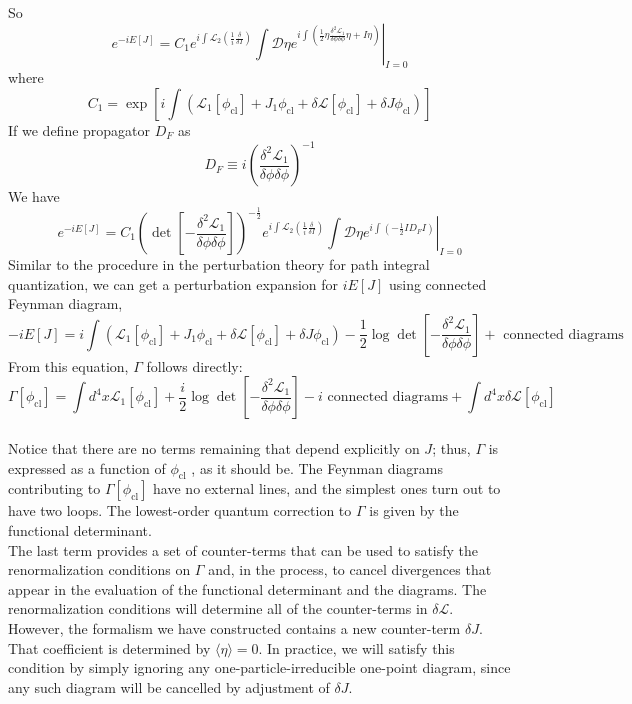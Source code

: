 \documentclass[cyan]{elegantnote}
\begin{document}
So
\[e^{-iE[J]} = C_1 e^{i\int \mathcal{L}_2(\frac{1}{i} \frac{\delta}{\delta I})} \left. \int \mathcal{D}\eta e^{i\int \left(\frac{1}{2} \eta \frac{\delta^2 \mathcal{L}_1}{\delta \phi \delta \phi} \eta + I\eta \right)} \right|_{I=0}\]
where
\[C_1 = \exp \left[ i \int ( \mathcal{L}_1 [\phi_{\mathrm{cl}}] + J_1\phi_{\mathrm{cl}} + \delta \mathcal{L}[\phi_{\mathrm{cl}}] + \delta J \phi_{\mathrm{cl}} )\right]\]
If we define propagator $D_F$ as
\[D_F \equiv i \left( \frac{\delta^2 \mathcal{L}_1}{\delta \phi \delta \phi}\right)^{-1}\]
We have
\[e^{-iE[J]} =C_1 \left( \det \left[  -\frac{\delta^2 \mathcal{L}_1}{\delta \phi \delta \phi} \right] \right) ^{-\frac{1}{2}} e^{i\int \mathcal{L}_2(\frac{1}{i} \frac{\delta}{\delta I})} \left. \int \mathcal{D}\eta e^{i\int \left(-\frac{1}{2} I D_F I \right)} \right|_{I=0}\]
Similar to the procedure in the perturbation theory for path integral quantization, we can get a perturbation expansion for $iE[J]$ using connected Feynman diagram,
\[-iE[J] = i \int ( \mathcal{L}_1 [\phi_{\mathrm{cl}}] + J_1\phi_{\mathrm{cl}} + \delta \mathcal{L}[\phi_{\mathrm{cl}}] + \delta J \phi_{\mathrm{cl}} ) - \frac{1}{2} \log \det \left[ - \frac{\delta^2 \mathcal{L}_1}{\delta \phi \delta \phi} \right] + \mbox{ connected diagrams }\]
From this equation, $\Gamma$ follows directly:
\[\Gamma[\phi_{\mathrm{cl}}] = \int d^4x \mathcal{L}_1[\phi_{\mathrm{cl}}] + \frac{i}{2} \log \det \left[ - \frac{\delta^2 \mathcal{L}_1}{\delta \phi \delta \phi} \right] -i \mbox{ connected diagrams} + \int d^4x \delta\mathcal{L}[\phi_{\mathrm{cl}}]\]
\\
Notice that there are no terms remaining that depend explicitly on $J$; thus, $\Gamma$ is expressed as a function of $\phi_{\mathrm{cl}}$ , as it should be. The Feynman diagrams contributing to $\Gamma[\phi_{\mathrm{cl}}]$ have no external lines, and the simplest ones turn out to have two loops. The lowest-order quantum correction to $\Gamma$ is given by the
functional determinant.
\\
The last term provides a set of counter-terms that can be used
to satisfy the renormalization conditions on $\Gamma$ and, in the process, to cancel divergences that appear in the evaluation of the functional determinant and the diagrams. The renormalization conditions will determine all of the counter-terms in $\delta \mathcal{L}$. However, the formalism we have constructed contains a new counter-term $\delta J$. That coefficient is determined by  $\langle \eta \rangle = 0$. In practice, we will satisfy this condition by simply ignoring any one-particle-irreducible one-point diagram, since any such diagram will be cancelled by adjustment of $\delta J$.
\end{document}
